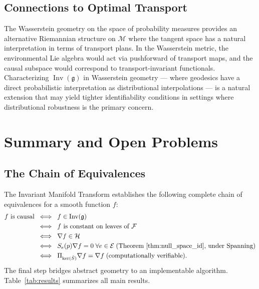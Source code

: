 \documentclass[11pt,a4paper]{article}
\DeclareMathOperator{\Inv}{Inv}
\newcommand{\g}{\mathfrak{g}}
\newcommand{\cM}{\mathcal{M}}
\newcommand{\cF}{\mathcal{F}}
\newcommand{\cH}{\mathcal{H}}
\newcommand{\cE}{\mathcal{E}}
\begin{document}
\subsection{Connections to Optimal Transport}

The Wasserstein geometry on the space of probability measures provides an alternative Riemannian structure on $\cM$ where the tangent space has a natural interpretation in terms of transport plans. In the Wasserstein metric, the environmental Lie algebra would act via pushforward of transport maps, and the causal subspace would correspond to transport-invariant functionals. Characterizing $\Inv(\g)$ in Wasserstein geometry — where geodesics have a direct probabilistic interpretation as distributional interpolations — is a natural extension that may yield tighter identifiability conditions in settings where distributional robustness is the primary concern.

\section{Summary and Open Problems}
\label{sec:conclusion}

\subsection{The Chain of Equivalences}

The Invariant Manifold Transform establishes the following complete chain of equivalences for a smooth function $f$:
\begin{align}
f \text{ is causal} \;&\iff\; f \in \Inv(\g) \nonumber\\
&\iff\; f \text{ is constant on leaves of } \cF \nonumber\\
&\iff\; \nabla f \in \cH \nonumber\\
&\iff\; S_e(p) \nabla f = 0 \;\forall e \in \cE \;\text{(Theorem~\ref{thm:null_space_id}, under Spanning)} \nonumber\\
&\iff\; \Pi_{\ker(\hat S)} \nabla f = \nabla f \;\text{(computationally verifiable)}.
\label{eq:chain}
\end{align}
The final step bridges abstract geometry to an implementable algorithm. Table~\ref{tab:results} summarizes all main results.
\end{document}
